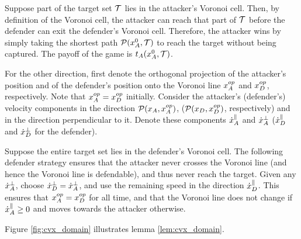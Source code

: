\begin{IEEEproof}
Suppose part of the target set $\mathcal{T}$ lies in the attacker's Voronoi cell. Then, by definition of the Voronoi cell, the attacker can reach that part of $\mathcal{T}$ before the defender can exit the defender's Voronoi cell. Therefore, the attacker wins by simply taking the shortest path $\mathcal{P}(x_A^0,\mathcal{T})$ to reach the target without being captured. The payoff of the game is $t_A(x_A^0,\mathcal{T})$.

For the other direction, first denote the orthogonal projection of the attacker's position and of the defender's position onto the Voronoi line $x_A^{op}$ and $x_D^{op}$, respectively. Note that $x_A^{op}=x_D^{op}$ initially. Consider the attacker's (defender's) velocity components in the direction $\mathcal{P}(x_A,x_A^{op})$, ($\mathcal{P}(x_D,x_D^{op})$, respectively) and in the direction perpendicular to it. Denote these components $\dot{x}_A^{\parallel}$ and $\dot{x}_A^{\perp}$ ($\dot{x}_D^{\parallel}$ and $\dot{x}_D^{\perp}$ for the defender).

Suppose the entire target set lies in the defender's Voronoi cell. The following defender strategy ensures that the attacker never crosses the Voronoi line (and hence the Voronoi line is defendable), and thus never reach the target. Given any $\dot{x}_A^{\perp}$, choose $\dot{x}_D^{\perp}=\dot{x}_A^{\perp}$, and use the remaining speed in the direction $\dot{x}_D^{\parallel}$. This ensures that $x_A^{op}=x_D^{op}$ for all time, and that the Voronoi line does not change if $\dot{x}_A^{\parallel}\ge0$ and moves towards the attacker otherwise.
\end{IEEEproof}

Figure \ref{fig:cvx_domain} illustrates lemma \ref{lem:cvx_domain}.

